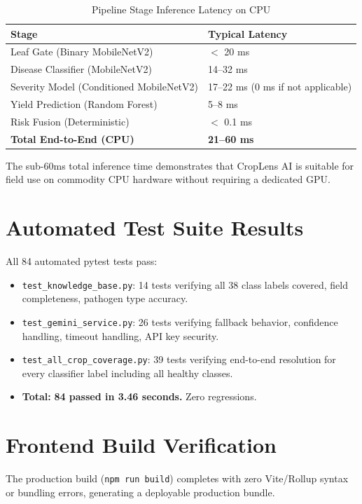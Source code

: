 \begin{table}[H]
\centering
\caption{Pipeline Stage Inference Latency on CPU}
\label{tab:latency}
\begin{tabular}{|p{7.5cm}|p{4.5cm}|}
\hline
\textbf{Stage} & \textbf{Typical Latency} \\
\hline
Leaf Gate (Binary MobileNetV2) & $<$ 20 ms \\
Disease Classifier (MobileNetV2) & 14--32 ms \\
Severity Model (Conditioned MobileNetV2) & 17--22 ms (0 ms if not applicable) \\
Yield Prediction (Random Forest) & 5--8 ms \\
Risk Fusion (Deterministic) & $<$ 0.1 ms \\
\hline
\textbf{Total End-to-End (CPU)} & \textbf{21--60 ms} \\
\hline
\end{tabular}
\end{table}

The sub-60ms total inference time demonstrates that CropLens AI is suitable for field use on commodity CPU hardware without requiring a dedicated GPU.

\section{Automated Test Suite Results}

All 84 automated pytest tests pass:
\begin{itemize}
    \item \texttt{test\_knowledge\_base.py}: 14 tests verifying all 38 class labels covered, field completeness, pathogen type accuracy.
    \item \texttt{test\_gemini\_service.py}: 26 tests verifying fallback behavior, confidence handling, timeout handling, API key security.
    \item \texttt{test\_all\_crop\_coverage.py}: 39 tests verifying end-to-end resolution for every classifier label including all healthy classes.
    \item \textbf{Total:} \textbf{84 passed in 3.46 seconds.} Zero regressions.
\end{itemize}

\section{Frontend Build Verification}

The production build (\texttt{npm run build}) completes with zero Vite/Rollup syntax or bundling errors, generating a deployable production bundle.

